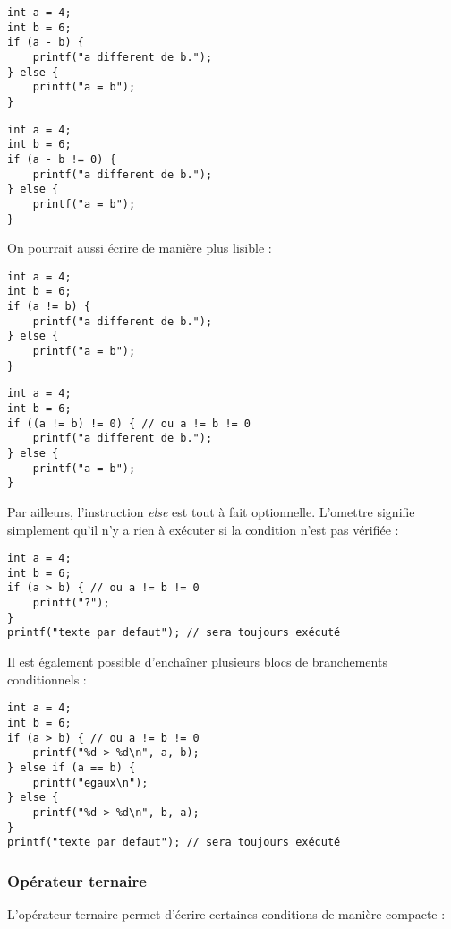 \documentclass[../../../main.tex]{subfiles}
\begin{document}
\begin{minipage}{0.5\textwidth}
\begin{verbatim}
int a = 4;
int b = 6;
if (a - b) {
	printf("a different de b.");
} else {
	printf("a = b");
}
\end{verbatim}
\end{minipage}
\begin{minipage}{0.5\textwidth}
\begin{verbatim}
int a = 4;
int b = 6;
if (a - b != 0) {
	printf("a different de b.");
} else {
	printf("a = b");
}
\end{verbatim}
\end{minipage}
 
On pourrait aussi écrire de manière plus lisible : 
 
\begin{minipage}{0.5\textwidth}
\begin{verbatim}
int a = 4;
int b = 6;
if (a != b) {
	printf("a different de b.");
} else {
	printf("a = b");
}
\end{verbatim}
\end{minipage}
\begin{minipage}{0.5\textwidth}
\begin{verbatim}
int a = 4;
int b = 6;
if ((a != b) != 0) { // ou a != b != 0
	printf("a different de b.");
} else {
	printf("a = b");
}
\end{verbatim}
\end{minipage}
 
Par ailleurs, l'instruction \textit{else} est tout à fait optionnelle. L'omettre signifie simplement qu'il n'y a rien à exécuter si la condition n'est pas vérifiée :
\begin{verbatim}
int a = 4;
int b = 6;
if (a > b) { // ou a != b != 0
	printf("?");
}
printf("texte par defaut"); // sera toujours exécuté
\end{verbatim}
Il est également possible d'enchaîner plusieurs blocs de branchements conditionnels :
\begin{verbatim}
int a = 4;
int b = 6;
if (a > b) { // ou a != b != 0
	printf("%d > %d\n", a, b);
} else if (a == b) {
	printf("egaux\n");
} else {
	printf("%d > %d\n", b, a);
}
printf("texte par defaut"); // sera toujours exécuté
\end{verbatim}
\subsubsection{Opérateur ternaire}
\label{ssub:op_rateur_ternaire}
L'opérateur ternaire permet d'écrire certaines conditions de manière compacte :
 
\end{document}

